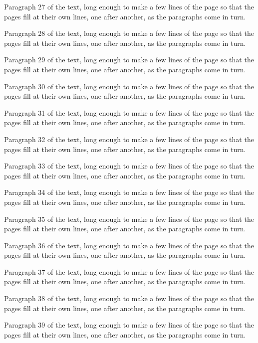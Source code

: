 \documentclass{article}
\begin{document}
Paragraph 27 of the text, long enough to make a few lines of the page so that the
pages fill at their own lines, one after another, as the paragraphs come in turn.

Paragraph 28 of the text, long enough to make a few lines of the page so that the
pages fill at their own lines, one after another, as the paragraphs come in turn.

Paragraph 29 of the text, long enough to make a few lines of the page so that the
pages fill at their own lines, one after another, as the paragraphs come in turn.

Paragraph 30 of the text, long enough to make a few lines of the page so that the
pages fill at their own lines, one after another, as the paragraphs come in turn.

\newpage

Paragraph 31 of the text, long enough to make a few lines of the page so that the
pages fill at their own lines, one after another, as the paragraphs come in turn.

Paragraph 32 of the text, long enough to make a few lines of the page so that the
pages fill at their own lines, one after another, as the paragraphs come in turn.

Paragraph 33 of the text, long enough to make a few lines of the page so that the
pages fill at their own lines, one after another, as the paragraphs come in turn.

Paragraph 34 of the text, long enough to make a few lines of the page so that the
pages fill at their own lines, one after another, as the paragraphs come in turn.

Paragraph 35 of the text, long enough to make a few lines of the page so that the
pages fill at their own lines, one after another, as the paragraphs come in turn.

Paragraph 36 of the text, long enough to make a few lines of the page so that the
pages fill at their own lines, one after another, as the paragraphs come in turn.

Paragraph 37 of the text, long enough to make a few lines of the page so that the
pages fill at their own lines, one after another, as the paragraphs come in turn.

Paragraph 38 of the text, long enough to make a few lines of the page so that the
pages fill at their own lines, one after another, as the paragraphs come in turn.

Paragraph 39 of the text, long enough to make a few lines of the page so that the
pages fill at their own lines, one after another, as the paragraphs come in turn.
\end{document}
